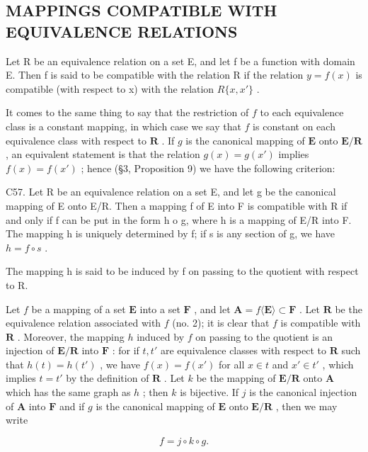 \subsection{MAPPINGS COMPATIBLE WITH EQUIVALENCE RELATIONS}

Let R be an equivalence relation on a set E, and let f be a function with domain E. Then f is said to be compatible with the relation R if the relation \(y = f(x)\) is compatible (with respect to x) with the relation \(R\{x, x'\}\) .

It comes to the same thing to say that the restriction of \(f\) to each equivalence class is a constant mapping, in which case we say that \(f\) is constant on each equivalence class with respect to \(\mathbf{R}\) . If \(g\) is the canonical mapping of \(\mathbf{E}\) onto \(\mathbf{E} / \mathbf{R}\) , an equivalent statement is that the relation \(g(x) = g(x')\) implies \(f(x) = f(x')\) ; hence (§3, Proposition 9) we have the following criterion:

C57. Let R be an equivalence relation on a set E, and let g be the canonical mapping of E onto E/R. Then a mapping f of E into F is compatible with R if and only if f can be put in the form h o g, where h is a mapping of E/R into F. The mapping h is uniquely determined by f; if s is any section of g, we have \(h = f \circ s\) .

The mapping h is said to be induced by f on passing to the quotient with respect to R.

Let \(f\) be a mapping of a set \(\mathbf{E}\) into a set \(\mathbf{F}\) , and let \(\mathbf{A} = f\langle \mathbf{E}\rangle \subset \mathbf{F}\) . Let \(\mathbf{R}\) be the equivalence relation associated with \(f\) (no. 2); it is clear that \(f\) is compatible with \(\mathbf{R}\) . Moreover, the mapping \(h\) induced by \(f\) on passing to the quotient is an injection of \(\mathbf{E} / \mathbf{R}\) into \(\mathbf{F}\) : for if \(t, t'\) are equivalence classes with respect to \(\mathbf{R}\) such that \(h(t) = h(t')\) , we have \(f(x) = f(x')\) for all \(x \in t\) and \(x' \in t'\) , which implies \(t = t'\) by the definition of \(\mathbf{R}\) . Let \(k\) be the mapping of \(\mathbf{E} / \mathbf{R}\) onto \(\mathbf{A}\) which has the same graph as \(h\) ; then \(k\) is bijective. If \(j\) is the canonical injection of \(\mathbf{A}\) into \(\mathbf{F}\) and if \(g\) is the canonical mapping of \(\mathbf{E}\) onto \(\mathbf{E} / \mathbf{R}\) , then we may write

\[
f = j \circ k \circ g.
\]

